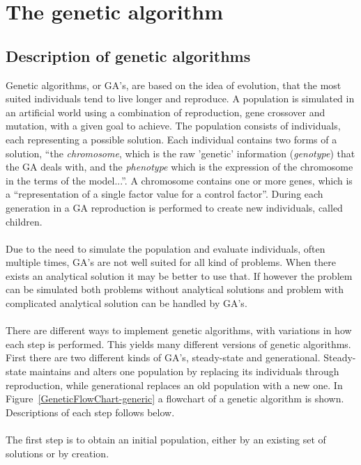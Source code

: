 \section{The genetic algorithm}
\subsection{Description of genetic algorithms}
Genetic algorithms, or GA's, are based on the idea of evolution, that the most suited individuals tend to live longer and reproduce. A population is simulated in an artificial world using a combination of reproduction, gene crossover and mutation, with a given goal to achieve. The population consists of individuals, each representing a possible  solution. Each individual contains two forms of a solution, ``the \textit{chromosome}, which is the raw 'genetic' information (\textit{genotype}) that the GA deals with, and the \textit{phenotype} which is the expression of the chromosome in the terms of the model...''\cite{GAHandbook1}. A chromosome contains one or more genes, which is a ``representation of a single factor value for a control factor''\cite{GAHandbook1}. During each generation in a GA reproduction is performed to create new individuals, called children.\\\\
Due to the need to simulate the population and evaluate individuals, often multiple times, GA's are not well suited for all kind of problems. When there exists an analytical solution it may be better to use that. %
If however the problem can be simulated both problems without analytical solutions and problem with complicated analytical solution can be handled by GA's.\\\\
There are different ways to implement genetic algorithms, with variations in how each step is performed. This yields many different versions of genetic algorithms. First there are two different kinds of GA's, steady-state and generational. Steady-state maintains and alters one population by replacing its individuals through reproduction, while generational replaces an old population with a new one. In Figure~\ref{GeneticFlowChart-generic} a flowchart of a genetic algorithm is shown. Descriptions of each step follows below.\\\\
The first step is to obtain an initial population, either by an existing set of solutions or by creation.\\\\
